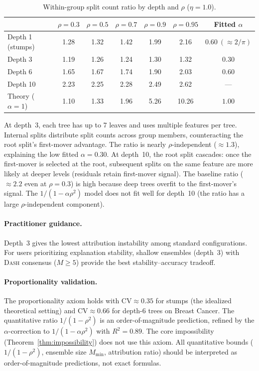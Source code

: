 \documentclass{jmlr}
\newcommand{\DASH}{\textsc{Dash}}
\begin{document}
\begin{table}[t]
\centering
\caption{Within-group split count ratio by depth and $\rho$ ($\eta{=}1.0$).}
\label{tab:depth-rho}
\small
\begin{tabular}{@{}lcccccc@{}}
\toprule
 & $\rho{=}0.3$ & $\rho{=}0.5$ & $\rho{=}0.7$ & $\rho{=}0.9$ & $\rho{=}0.95$ & Fitted $\alpha$ \\
\midrule
Depth 1 (stumps) & 1.28 & 1.32 & 1.42 & 1.99 & 2.16 & $0.60\ (\approx 2/\pi)$ \\
Depth 3          & 1.19 & 1.26 & 1.24 & 1.30 & 1.32 & $0.30$ \\
Depth 6          & 1.65 & 1.67 & 1.74 & 1.90 & 2.03 & $0.60$ \\
Depth 10         & 2.23 & 2.25 & 2.28 & 2.49 & 2.62 & --- \\
\midrule
Theory ($\alpha{=}1$) & 1.10 & 1.33 & 1.96 & 5.26 & 10.26 & $1.00$ \\
\bottomrule
\end{tabular}
\end{table}

At depth~3, each tree has up to 7 leaves and uses multiple features per tree. Internal splits distribute split counts across group members, counteracting the root split's first-mover advantage. The ratio is nearly $\rho$-independent ($\approx 1.3$), explaining the low fitted $\alpha = 0.30$. At depth~10, the root split cascades: once the first-mover is selected at the root, subsequent splits on the same feature are more likely at deeper levels (residuals retain first-mover signal). The baseline ratio ($\approx 2.2$ even at $\rho = 0.3$) is high because deep trees overfit to the first-mover's signal. The $1/(1-\alpha\rho^2)$ model does not fit well for depth~10 (the ratio has a large $\rho$-independent component).

\paragraph{Practitioner guidance.}
Depth~3 gives the lowest attribution instability among standard configurations. For users prioritizing explanation stability, shallow ensembles (depth~3) with \DASH{} consensus ($M \geq 5$) provide the best stability--accuracy tradeoff.

\paragraph{Proportionality validation.}
The proportionality axiom holds with CV${\approx}0.35$ for stumps (the idealized theoretical setting) and CV${\approx}0.66$ for depth-6 trees on Breast Cancer. The quantitative ratio $1/(1{-}\rho^2)$ is an order-of-magnitude prediction, refined by the $\alpha$-correction to $1/(1{-}\alpha\rho^2)$ with $R^2 = 0.89$. The core impossibility (Theorem~\ref{thm:impossibility}) does not use this axiom. All quantitative bounds ($1/(1{-}\rho^2)$, ensemble size $M_{\min}$, attribution ratio) should be interpreted as order-of-magnitude predictions, not exact formulas.
\end{document}
